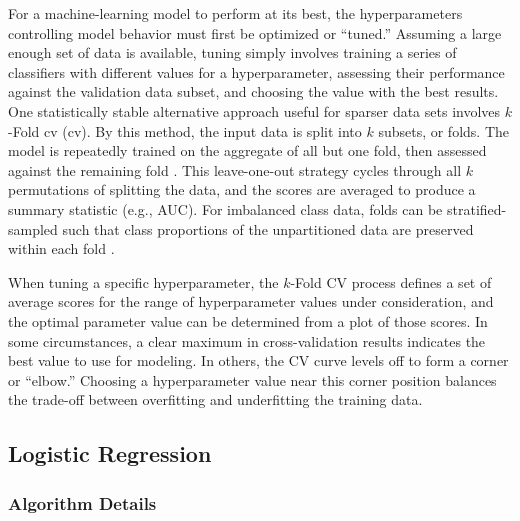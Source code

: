 For a machine-learning model to perform at its best, the hyperparameters controlling model behavior must first be optimized or ``tuned.'' Assuming a large enough set of data is available, tuning simply involves training a series of classifiers with different values for a hyperparameter, assessing their performance against the validation data subset, and choosing the value with the best results. One statistically stable alternative approach useful for sparser data sets involves $k$-Fold \acrlong{cv} (\acrshort{cv}). By this method, the input data is split into $k$ subsets, or folds. The model is repeatedly trained on the aggregate of all but one fold, then assessed against the remaining fold \citep[p.\ 181]{james_introduction_2013}. This leave-one-out strategy cycles through all $k$ permutations of splitting the data, and the scores are averaged to produce a summary statistic (e.g., AUC). For imbalanced class data, folds can be stratified-sampled such that class proportions of the unpartitioned data are preserved within each fold \citep{brownlee_how_2020}. 

When tuning a specific hyperparameter, the $k$-Fold CV process defines a set of average scores for the range of hyperparameter values under consideration, and the optimal parameter value can be determined from a plot of those scores. In some circumstances, a clear maximum in cross-validation results indicates the best value to use for modeling. In others, the CV curve levels off to form a corner or ``elbow.'' Choosing a hyperparameter value near this corner position balances the trade-off between overfitting and underfitting the training data.

\subsection{Logistic Regression}\label{ch3:logistic_regression}

\subsubsection{Algorithm Details} \label{ch3:lr_details}

